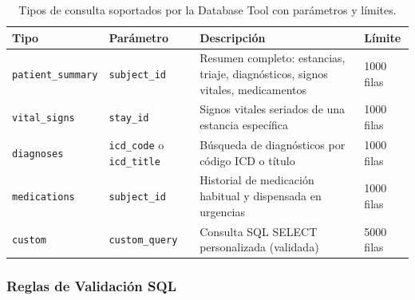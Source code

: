 \begin{table}[H]
\centering
\caption{Tipos de consulta soportados por la Database Tool con parámetros y límites.}
\label{tab:appendix_querytypes}
\footnotesize
\begin{tabularx}{\columnwidth}{llXl}
\toprule
\textbf{Tipo} & \textbf{Parámetro} & \textbf{Descripción} & \textbf{Límite} \\
\midrule
\texttt{patient\_summary} & \texttt{subject\_id} & Resumen completo: estancias, triaje, diagnósticos, signos vitales, medicamentos & 1000 filas \\
\addlinespace
\texttt{vital\_signs} & \texttt{stay\_id} & Signos vitales seriados de una estancia específica & 1000 filas \\
\addlinespace
\texttt{diagnoses} & \texttt{icd\_code} o \texttt{icd\_title} & Búsqueda de diagnósticos por código \ac{ICD} o título & 1000 filas \\
\addlinespace
\texttt{medications} & \texttt{subject\_id} & Historial de medicación habitual y dispensada en urgencias & 1000 filas \\
\addlinespace
\texttt{custom} & \texttt{custom\_query} & Consulta \ac{SQL} SELECT personalizada (validada) & 5000 filas \\
\bottomrule
\end{tabularx}
\end{table}

\subsubsection{Reglas de Validación SQL}

